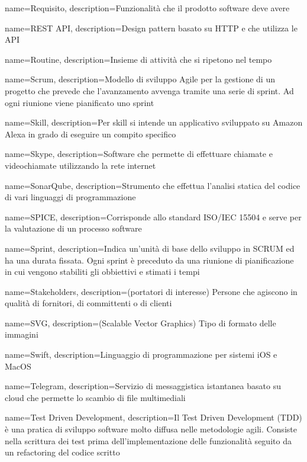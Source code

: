 {
	name={Requisito},
	description={Funzionalità che il prodotto software deve avere}
}

{
	name={REST API},
	description={Design pattern basato su HTTP e che utilizza le API}
}

{
	name={Routine},
	description={Insieme di attività che si ripetono nel tempo}
	{\newpage}
}

{
	name={Scrum},
	description={Modello di sviluppo Agile per la gestione di un progetto che prevede che l’avanzamento avvenga tramite una serie di sprint. Ad ogni riunione viene pianificato uno sprint}
}

{
	name={Skill},
	description={Per skill si intende un applicativo sviluppato su Amazon Alexa in grado di eseguire un compito specifico}
}

{
	name={Skype},
	description={Software che permette di effettuare chiamate e videochiamate utilizzando la rete internet}
}

{
	name={SonarQube},
	description={Strumento che effettua l’analisi statica del codice di vari linguaggi di programmazione}
}

{
	name={SPICE},
	description={Corrisponde allo standard ISO/IEC 15504 e serve per la valutazione di un processo software}
}

{
	name={Sprint},
	description={Indica un’unità di base dello sviluppo in SCRUM ed ha una durata fissata. Ogni sprint è preceduto da una riunione di pianificazione in cui vengono stabiliti gli obbiettivi e stimati i tempi}
}

{
	name={Stakeholders},
	description={(portatori di interesse) Persone che agiscono in qualità di fornitori, di committenti o di clienti}
}

{
	name={SVG},
	description={(Scalable Vector Graphics) Tipo di formato delle immagini}
}

{
	name={Swift},
	description={Linguaggio di programmazione per sistemi iOS e MacOS}
	{\newpage}
}

{
	name={Telegram},
	description={Servizio di messaggistica istantanea basato su cloud che permette lo scambio di file multimediali}
}

{
	name={Test Driven Development},
	description={Il Test Driven Development (TDD) è una pratica di sviluppo software molto diffusa nelle metodologie agili.
		Consiste nella scrittura dei test prima dell'implementazione delle funzionalità seguito da un refactoring del codice scritto}
}

